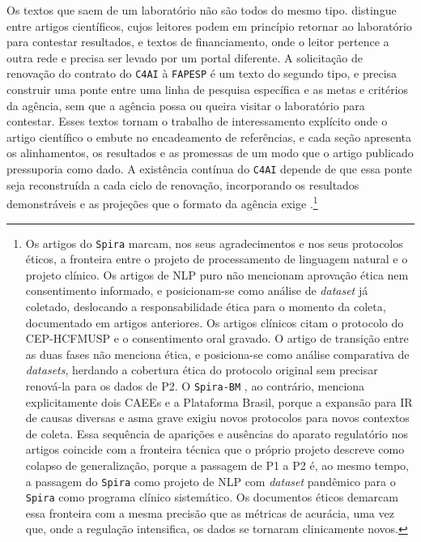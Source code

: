 Os textos que saem de um laboratório não são todos do mesmo tipo. \textcite{Law1986Laboratories} distingue entre artigos científicos, cujos leitores podem em princípio retornar ao laboratório para contestar resultados, e textos de financiamento, onde o leitor pertence a outra rede e precisa ser levado por um portal diferente. A solicitação de renovação do contrato do \texttt{C4AI} à \texttt{FAPESP} é um texto do segundo tipo, e precisa construir uma ponte entre uma linha de pesquisa específica e as metas e critérios da agência, sem que a agência possa ou queira visitar o laboratório para contestar. Esses textos tornam o trabalho de interessamento explícito onde o artigo científico o embute no encadeamento de referências, e cada seção apresenta os alinhamentos, os resultados e as promessas de um modo que o artigo publicado pressuporia como dado. A existência contínua do \texttt{C4AI} depende de que essa ponte seja reconstruída a cada ciclo de renovação, incorporando os resultados demonstráveis e as projeções que o formato da agência exige \parencite{Law1986Laboratories}.\footnote{Os artigos do \texttt{Spira} marcam, nos seus agradecimentos e nos seus protocolos éticos, a fronteira entre o projeto de processamento de linguagem natural e o projeto clínico. Os artigos de NLP puro \parencite{Casanova2021DeepLearning,Gauy2021MFCC,Silva2022Interpretability} não mencionam aprovação ética nem consentimento informado, e posicionam-se como análise de \textit{dataset} já coletado, deslocando a responsabilidade ética para o momento da coleta, documentado em artigos anteriores. Os artigos clínicos \parencite{Svartman2022Temporal,Berti2023Frequency,Berti2025Healthcare} citam o protocolo do CEP-HCFMUSP e o consentimento oral gravado. O artigo de transição entre as duas fases \parencite{Gauy2024Discriminant} não menciona ética, e posiciona-se como análise comparativa de \textit{datasets}, herdando a cobertura ética do protocolo original sem precisar renová-la para os dados de P2. O \texttt{Spira-BM} \parencite{Finger2025SPIRABM}, ao contrário, menciona explicitamente dois CAEEs e a Plataforma Brasil, porque a expansão para IR de causas diversas e asma grave exigiu novos protocolos para novos contextos de coleta. Essa sequência de aparições e ausências do aparato regulatório nos artigos coincide com a fronteira técnica que o próprio projeto descreve como colapso de generalização, porque a passagem de P1 a P2 é, ao mesmo tempo, a passagem do \texttt{Spira} como projeto de NLP com \textit{dataset} pandêmico para o \texttt{Spira} como programa clínico sistemático. Os documentos éticos demarcam essa fronteira com a mesma precisão que as métricas de acurácia, uma vez que, onde a regulação intensifica, os dados se tornaram clinicamente novos.}

